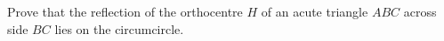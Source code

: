 Prove that the reflection of the orthocentre $H$ of an acute triangle $ABC$ across side $BC$ lies on the circumcircle.
